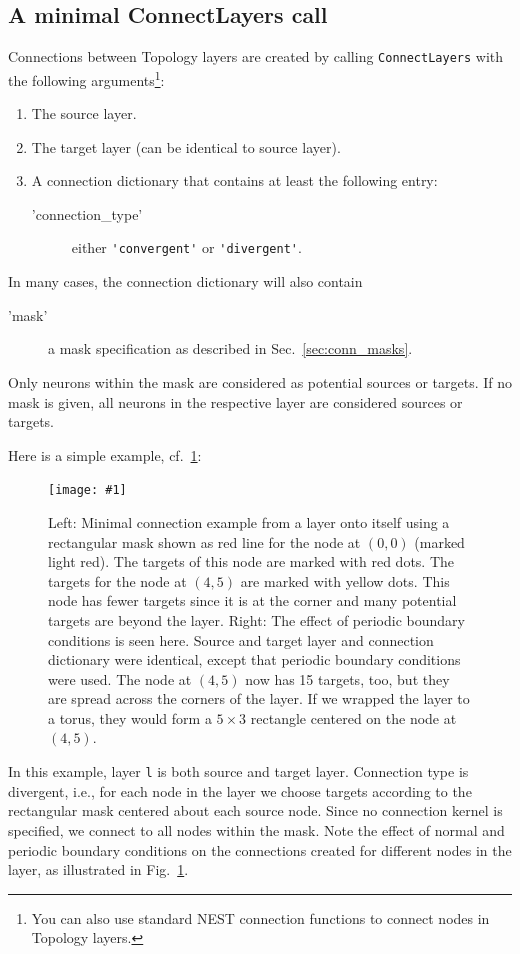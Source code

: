 \documentclass[a4paper,12pt]{report}
\newcommand{\scriptfig}[4]{%
\begin{figure}
\centerline{\texttt{[image: \#1]}}
\caption[#3]{#4}
\label{fig:#1}
\end{figure}%
}
\begin{document}
\subsection{A minimal ConnectLayers call}\label{sec:minimalcall}
Connections between Topology layers are created by calling
\lstinline!ConnectLayers! with the following arguments\footnote{You
  can also use standard NEST connection functions to connect nodes in
  Topology layers.}:
\begin{enumerate}
\item The source layer.
\item The target layer (can be identical to source layer).
\item A connection dictionary that contains at least the following entry:
\begin{description}
\item['connection\_type'] either \lstinline!'convergent'!
  or \lstinline!'divergent'!.
\end{description}
\end{enumerate}
In many cases, the connection dictionary will also contain
\begin{description}
\item['mask'] a mask specification as described in
  Sec.~\ref{sec:conn_masks}.
\end{description}
Only neurons within the mask are considered as potential sources or
targets. If no mask is given, all neurons in the respective layer
are considered sources or targets.

Here is a simple example, cf.~\ref{fig:conn1}:
%

\scriptfig{conn1}{0.9}{Minimal connection example}%
{Left: Minimal connection example from a layer onto itself using a
  rectangular mask shown as red line for the node at $(0,0)$ (marked
  light red). The targets of this node are marked with red dots. The targets
  for the node at $(4,5)$ are marked with yellow
  dots. This node has fewer targets since it is at the corner and many
  potential targets are beyond the layer.
Right: The effect of periodic boundary conditions\index{periodic
  boundary cond.} is seen here. Source and target layer and connection dictionary
were identical, except that periodic boundary conditions were
used. The node at $(4,5)$ now has 15 targets, too, but they are spread
across the corners of the layer. If we wrapped the layer to a torus,
they would form a $5\times 3$ rectangle centered on the node at $(4,5)$.}
%
In this example, layer \lstinline!l! is both source and target
layer. Connection type is divergent, i.e., for each node in the layer
we choose targets according to the rectangular mask centered about
each source node. Since no connection kernel is specified, we connect
to all nodes within the mask. Note the effect of normal and periodic
boundary conditions on the connections created for different nodes in
the layer, as illustrated in Fig.~\ref{fig:conn1}.
\end{document}
